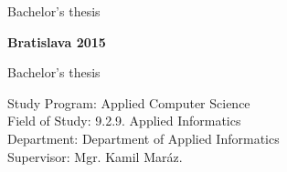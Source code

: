 \begin{center}
\centerline{\LARGE\textbf\skola}
\Large\textbf\fakulta
\end{center}

\vspace*{6cm}

\begin{center}
\begin{minipage}{0.8\textwidth}
\begin{center}
 \LARGE\sc\textbf\nazov 
\end{center}
\vspace{1em}
\centerline{\Large Bachelor's thesis}
\end{minipage}
\end{center}

\vfill
\noindent
 {\bf Bratislava 2015}  \hfill {\bf \autor}
\thispagestyle{empty}



\newpage
\begin{center}
\centerline{\LARGE\textbf\skola}
\Large\textbf\fakulta
\end{center}

\vspace*{6cm}

\begin{center}
\begin{minipage}{0.8\textwidth}
\begin{center}
 \LARGE\sc\textbf\nazov 
\end{center}
\vspace{1em}
\centerline{\Large Bachelor's thesis}
\end{minipage}
\end{center}

\vspace{5cm}

\linespread{1.3}%
\selectfont

\noindent
Study Program: \hspace{0.8em} Applied Computer Science\\
Field of Study: \hspace{1.0em} 9.2.9. Applied Informatics\\
Department: \hspace{2.0em} Department of Applied Informatics\\
Supervisor: \hspace{2.4em} Mgr. Kamil Maráz. \\


